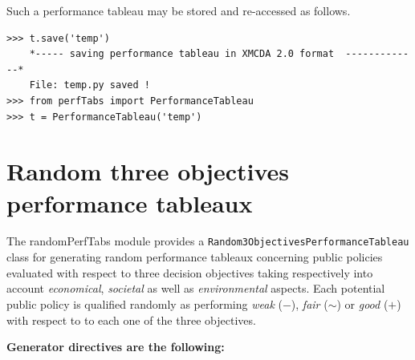 Such a performance tableau may be stored and re-accessed as follows.
\begin{lstlisting}
>>> t.save('temp')
    *----- saving performance tableau in XMCDA 2.0 format  -------------*
    File: temp.py saved !
>>> from perfTabs import PerformanceTableau
>>> t = PerformanceTableau('temp')
\end{lstlisting}

\section{Random three objectives performance tableaux}
\label{sec:6.4}

The randomPerfTabs module provides a \texttt{Random3ObjectivesPerformance\-Tableau} class for generating random performance tableaux concerning public policies evaluated with respect to three decision objectives taking respectively into account \emph{economical}, \emph{societal} as well as \emph{environmental} aspects. Each potential public policy is qualified randomly as performing \emph{weak} ($-$), \emph{fair} ($\sim$) or \emph{good} ($+$) with respect to to each one of the three objectives. 

\noindent \textbf{Generator directives are the following:}

